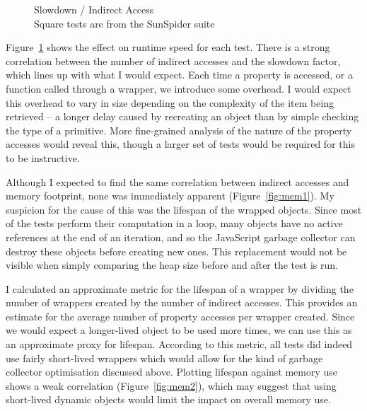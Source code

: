 \documentclass[12pt,a4paper,twoside,openright]{report}
\theoremstyle{definition}
\theoremstyle{dotless}
\begin{document}
\begin{figure}[H]
  \caption[Graph of Slowdown / Indirect Access]{Slowdown / Indirect Access \\ \footnotesize{Square tests are from the SunSpider suite}}
  \label{fig:slowdown}
\end{figure}

Figure~\ref{fig:slowdown} shows the effect on runtime speed for each test. 
There is a strong correlation between the number of indirect accesses
and the slowdown factor, which lines up with what I would expect. Each time a
property is accessed, or a function called through a wrapper, we 
introduce some overhead. I would expect this overhead to vary in size depending 
on the complexity of the item being retrieved -- a longer delay caused 
by recreating an object than by simple checking the type of a primitive. More fine-grained
analysis of the nature of the property accesses would reveal this, though a larger
set of tests would be required for this to be instructive.

Although I expected to find the same correlation between indirect accesses and
memory footprint, none was immediately apparent (Figure~\ref{fig:mem1}). My
suspicion for the cause of this was the lifespan of the wrapped objects. Since
most of the tests perform their computation in a loop, many objects have no active references
at the end of an iteration, and so the JavaScript garbage
collector can destroy these objects before creating new ones. This replacement
would not be visible when simply comparing the heap size before and after the test
is run. 

I calculated an approximate metric for the lifespan of a wrapper by dividing
the number of wrappers created by the number of indirect accesses.  This
provides an estimate for the average number of property accesses per wrapper
created. Since we would expect a longer-lived object to be used more times, we
can use this as an approximate proxy for lifespan. According to this metric,
all tests did indeed use fairly short-lived wrappers which would allow for the
kind of garbage collector optimisation discussed above. Plotting lifespan
against memory use shows a weak correlation (Figure~\ref{fig:mem2}), which may
suggest that using short-lived dynamic objects would limit the impact on
overall memory use.
\end{document}
